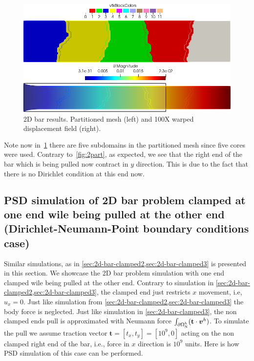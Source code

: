 \begin{figure}[htbp]
    \centering
    \begin{minipage}[t][2cm][t]{0.36\textwidth}
    \includegraphics[align=b,width=1\textwidth]{./Images/2d-bar-partitioned5.png}
    \end{minipage}\hspace{.1\textwidth}
    \begin{minipage}[t][2cm][t]{0.5\textwidth}
    \includegraphics[align=b,width=1\textwidth]{./Images/2d-bar-clamped-traction.png}
    \end{minipage}
    \caption{2D bar results. Partitioned mesh (left) and 100X warped displacement field (right).}
    \label{fig:5part}
\end{figure}

Note now in~\cref{fig:5part} there are five subdomains in the partitioned mesh since five cores were used. Contrary to~\cref{fig:2part}, as expected, we see that the right end of the bar which is being pulled now contract in $y$ direction. This is due to the fact that there is no Dirichlet condition at this end now. 

\pagebreak




\subsection{PSD simulation of 2D bar problem clamped at one end wile being pulled at the other end (Dirichlet-Neumann-Point boundary conditions case)\label{sec:2d-bar-clamped4}}


Similar simulations, as in \cref{sec:2d-bar-clamped2,sec:2d-bar-clamped3} is presented in this section. We showcase the 2D bar problem simulation with one end clamped  wile being pulled at the other end. Contrary to simulation in \cref{sec:2d-bar-clamped2,sec:2d-bar-clamped3}, the clamped end just restricts $x$ movement, i.e, $u_x=0$. Just like simulation from \cref{sec:2d-bar-clamped2,sec:2d-bar-clamped3} the body force is neglected. Just like simulation in  \cref{sec:2d-bar-clamped3}, the non clamped ends pull is approximated with Neumann force $\int_{\partial\Omega^h_{\text N}}(\mathbf t\cdot \boldsymbol v^h)$. To simulate the pull we assume traction vector $\mathbf t=[t_x,t_y]=[10^9,0]$ acting on the non clamped right end of the bar, i.e., force in $x$ direction is $10^9$ units. Here is how PSD simulation of this case can be performed.


